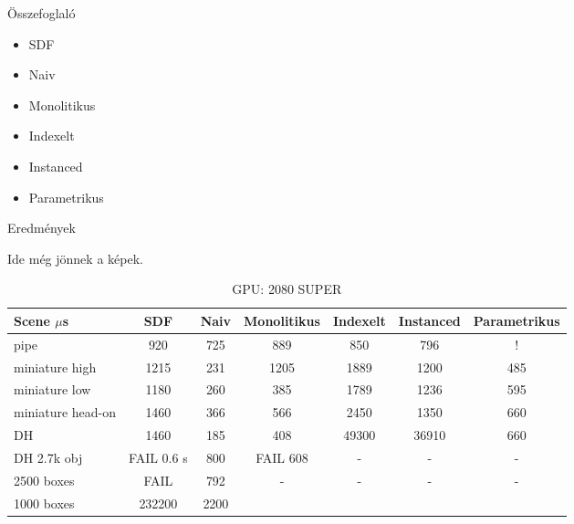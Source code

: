 \documentclass[xcolor=dvipsnames,aspectratio=169,9pt]{beamer}
\begin{document}
\begin{frame}{Összefoglaló}
	\begin{itemize}
		\item SDF
		\item Naiv
		\item Monolitikus
		\item Indexelt
		\item Instanced
		\item Parametrikus
	\end{itemize}
\end{frame}
\begin{frame}{Eredmények}

	Ide még jönnek a képek.
			
		\begin{table}[htbp]
			\centering
			\begin{tabular}{|l|c|c|c|c|c|c|}
				\hline
				\textbf{Scene $\mu$s} & \textbf{SDF} & \textbf{Naiv} & \textbf{Monolitikus} & \textbf{Indexelt} & \textbf{Instanced} & \textbf{Parametrikus} \\ \hline
				pipe & 920 & 725 & 889 & 850 & 796 & ! \\ \hline
				miniature high & 1215 & 231 & 1205 & 1889 & 1200 & 485 \\ \hline
				miniature low & 1180 & 260 & 385 & 1789 & 1236 & 595 \\ \hline
				miniature head-on & 1460 & 366 & 566 & 2450 & 1350 & 660 \\ \hline
				DH & 1460 & 185 & 408 & 49300 & 36910 & 660 \\ \hline
				DH 2.7k obj & FAIL 0.6 s & 800 & FAIL 608 & - & - & - \\ \hline
				2500 boxes & FAIL & 792 & - & - & - & - \\ \hline
				1000 boxes & 232200 & 2200 & & & & \\ \hline
			\end{tabular}
			
			\caption{GPU: 2080 SUPER}
			\label{tab:timing_data}
		\end{table}
\end{frame}
\end{document}
